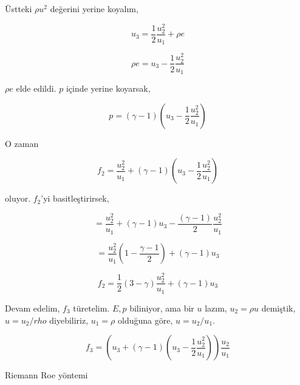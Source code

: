 \documentclass[12pt,fleqn]{article}\usepackage{../../common}
\begin{document}
Üstteki $\rho u^2$ değerini yerine koyalım,

$$
u_3 = \frac{1}{2} \frac{u_2^2}{u_1} + \rho e
$$

$$
\rho e = u_3 - \frac{1}{2} \frac{u_2^2}{u_1} 
$$

$\rho e$ elde edildi. $p$ içinde yerine koyarsak,

$$
p = (\gamma - 1) \left(  u_3 - \frac{1}{2} \frac{u_2^2}{u_1}   \right)
$$

O zaman

$$
f_2 = \frac{u_2^2}{u_1} +  (\gamma - 1) \left(  u_3 - \frac{1}{2} \frac{u_2^2}{u_1}   \right)
$$

oluyor. $f_2$'yi basitleştirirsek,

$$
= \frac{u_2^2}{u_1} + (\gamma - 1)u_3 - \frac{(\gamma-1)}{2} \frac{u_2^2}{u_1}
$$

$$
= \frac{u_2^2}{u_1} \left( 1 - \frac{\gamma-1}{2}  \right) + (\gamma - 1)u_3
$$

$$
f_2 = \frac{1}{2} (3-\gamma) \frac{u_2^2}{u_1} + (\gamma - 1)u_3
$$

Devam edelim, $f_3$ türetelim. $E,p$ biliniyor, ama bir $u$ lazım,
$u_2 = \rho u$ demiştik, $u = u_2 / rho$ diyebiliriz, $u_1 = \rho$
olduğuna göre, $u = u_2 / u_1$.

$$
f_3 =  \left(
  u_3 + (\gamma - 1) ( u_3 - \frac{1}{2} \frac{u_2^2}{u_1})
\right) \frac{u_2}{u_1}
$$




Riemann Roe yöntemi 
\end{document}
